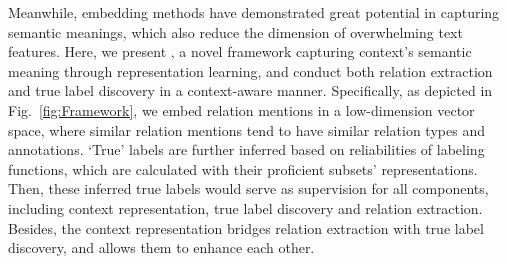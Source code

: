 
Meanwhile, embedding methods have demonstrated great potential in capturing semantic meanings, which also reduce the dimension of overwhelming text features.
Here, we present \our, a novel framework capturing context's semantic meaning through representation learning, and conduct both relation extraction and true label discovery in a context-aware manner.
Specifically, as depicted in Fig.~\ref{fig:Framework}, we embed relation mentions in a low-dimension vector space, where similar relation mentions tend to have similar relation types and annotations. 
`True' labels are further inferred based on reliabilities of labeling functions, which are calculated with their proficient subsets' representations.
Then, these inferred true labels would serve as supervision for all components, including context representation, true label discovery and relation extraction.
Besides, the context representation bridges relation extraction with true label discovery, and allows them to enhance each other.

